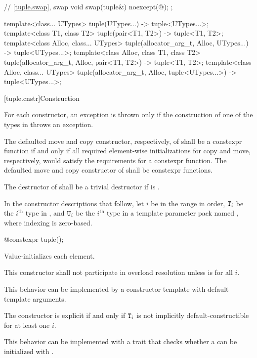 \begin{codeblock}
{{      // \ref{tuple.swap},  swap
      void swap(tuple&) noexcept(@\seebelow@);
    };

  template<class... UTypes>
    tuple(UTypes...) -> tuple<UTypes...>;
  template<class T1, class T2>
    tuple(pair<T1, T2>) -> tuple<T1, T2>;
  template<class Alloc, class... UTypes>
    tuple(allocator_arg_t, Alloc, UTypes...) -> tuple<UTypes...>;
  template<class Alloc, class T1, class T2>
    tuple(allocator_arg_t, Alloc, pair<T1, T2>) -> tuple<T1, T2>;
  template<class Alloc, class... UTypes>
    tuple(allocator_arg_t, Alloc, tuple<UTypes...>) -> tuple<UTypes...>;
}
\end{codeblock}

[tuple.cnstr]{Construction}

\pnum
For each  constructor, an exception is thrown only if the construction of
one of the types in  throws an exception.

\pnum
The defaulted move and copy constructor, respectively, of
 shall be a constexpr function if and only if all
required element-wise initializations for copy and move, respectively,
would satisfy the requirements for a constexpr function. The
defaulted move and copy constructor of  shall be
constexpr functions.

\pnum
The destructor of  shall be a trivial destructor if
is .

\pnum
In the constructor descriptions that follow, let $i$ be in the range
 in order, $\texttt{T}_i$
be the $i^\text{th}$ type in , and
$\texttt{U}_i$ be the $i^\text{th}$ type in a template parameter pack named , where indexing
is zero-based.

%
\begin{itemdecl}
@\EXPLICIT@ constexpr tuple();
\end{itemdecl}

\begin{itemdescr}
\pnum
\effects Value-initializes each element.

\pnum
\remarks
This constructor shall not participate in overload resolution unless
 is  for all $i$.
\begin{note} This behavior can be implemented by a constructor template
with default template arguments. \end{note}
The constructor is explicit if and only if $\texttt{T}_i$ is not implicitly
default-constructible for at least one $i$.
\begin{note} This behavior can be implemented with a trait that checks whether
a  can be initialized with \tcode{\{\}}. \end{note}
\end{itemdescr}

